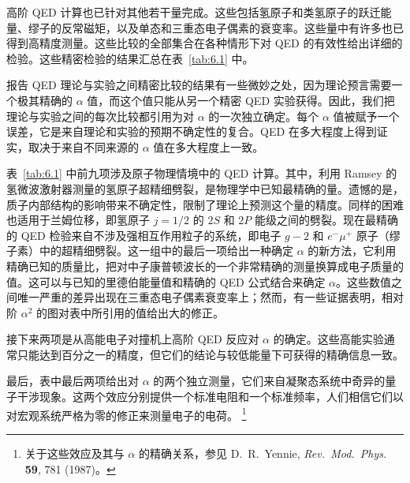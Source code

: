 高阶 QED 计算也已针对其他若干量完成。这些包括氢原子和类氢原子的跃迁能量、缪子的反常磁矩，以及单态和三重态电子偶素的衰变率。这些量中有许多也已得到高精度测量。这些比较的全部集合在各种情形下对 QED 的有效性给出详细的检验。这些精密检验的结果汇总在表~\ref{tab:6.1} 中。

报告 QED 理论与实验之间精密比较的结果有一些微妙之处，因为理论预言需要一个极其精确的 $\alpha$ 值，而这个值只能从另一个精密 QED 实验获得。因此，我们把理论与实验之间的每次比较都引用为对 $\alpha$ 的一次独立确定。每个 $\alpha$ 值被赋予一个误差，它是来自理论和实验的预期不确定性的复合。QED 在多大程度上得到证实，取决于来自不同来源的 $\alpha$ 值在多大程度上一致。

表~\ref{tab:6.1} 中前九项涉及原子物理情境中的 QED 计算。其中，利用 Ramsey 的氢微波激射器测量的氢原子超精细劈裂，是物理学中已知最精确的量。遗憾的是，质子内部结构的影响带来不确定性，限制了理论上预测这个量的精度。同样的困难也适用于兰姆位移，即氢原子 $j = 1/2$ 的 $2S$ 和 $2P$ 能级之间的劈裂。现在最精确的 QED 检验来自不涉及强相互作用粒子的系统，即电子 $g-2$ 和 $e^{-}\mu^{+}$ 原子（缪子素）中的超精细劈裂。这一组中的最后一项给出一种确定 $\alpha$ 的新方法，它利用精确已知的质量比，把对中子康普顿波长的一个非常精确的测量换算成电子质量的值。这可以与已知的里德伯能量值和精确的 QED 公式结合来确定 $\alpha$。这些数值之间唯一严重的差异出现在三重态电子偶素衰变率上；然而，有一些证据表明，相对阶 $\alpha^2$ 的图对表中所引用的值给出大的修正。

接下来两项是从高能电子对撞机上高阶 QED 反应对 $\alpha$ 的确定。这些高能实验通常只能达到百分之一的精度，但它们的结论与较低能量下可获得的精确信息一致。

最后，表中最后两项给出对 $\alpha$ 的两个独立测量，它们来自凝聚态系统中奇异的量子干涉现象。这两个效应分别提供一个标准电阻和一个标准频率，人们相信它们以对宏观系统严格为零的修正来测量电子的电荷。%
\footnote{关于这些效应及其与 $\alpha$ 的精确关系，参见 D.~R.~Yennie, \emph{Rev.\ Mod.\ Phys.} \textbf{59}, 781 (1987)。}

